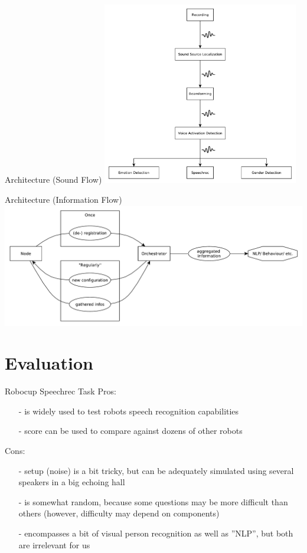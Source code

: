 \documentclass{beamer}
\begin{document}
	\begin{frame}{Architecture (Sound Flow)}
		\centering
		\includegraphics[height=8cm]{Bilder/audio_flow_2}
	\end{frame}
	
	\begin{frame}{Architecture (Information Flow)}
		\centering
		\includegraphics[width=\textwidth]{Bilder/orchestrator}
	\end{frame}
	
	
	
	
	
	
	
	
	\section{Evaluation}
	
	\begin{frame}{Robocup Speechrec Task}
		\pause
		Pros:
		\begin{itemize}
			\item[-] is widely used to test robots speech recognition capabilities
			\item[-] score can be used to compare against dozens of other robots
		\end{itemize}
		\pause
		Cons:
		\begin{itemize}
			\item[-] setup (noise) is a bit tricky, but can be adequately simulated using several speakers in a big echoing hall
			\item[-] is somewhat random, because some questions may be more difficult than others (however, difficulty may depend on components)
			\item[-] encompasses a bit of visual person recognition as well as ''NLP'', but both are irrelevant for us
		\end{itemize}
	\end{frame}
	
\end{document}
